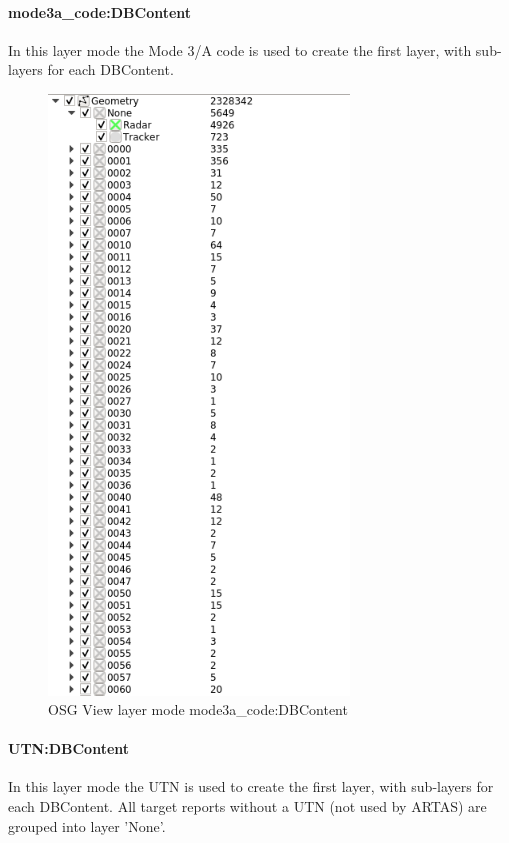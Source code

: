 \paragraph{mode3a\_code:DBContent}

In this layer mode the Mode 3/A code is used to create the first layer, with sub-layers for each DBContent.

\begin{figure}[H]
\center
    \includegraphics[width=8cm,frame]{figures/osgview_group_ma_dbo.png}
  \caption{OSG View layer mode mode3a\_code:DBContent}
\end{figure}

\paragraph{UTN:DBContent}

In this layer mode the UTN is used to create the first layer, with sub-layers for each DBContent. All target reports without a UTN (not used by ARTAS) are grouped into layer 'None'.  \\

